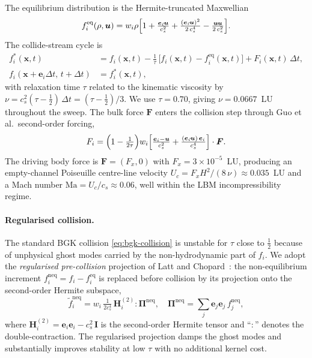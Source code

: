 \documentclass[11pt,a4paper]{article}
\begin{document}
The equilibrium distribution is the Hermite-truncated Maxwellian
\begin{equation}
f_i^{\text{eq}}(\rho,\boldsymbol u) =
   w_i \rho
   \Bigl[
     1
     + \tfrac{\boldsymbol e_i \!\cdot\! \boldsymbol u}{c_s^2}
     + \tfrac{(\boldsymbol e_i \!\cdot\! \boldsymbol u)^2}{2\,c_s^4}
     - \tfrac{\boldsymbol u \!\cdot\! \boldsymbol u}{2\,c_s^2}
   \Bigr].
\label{eq:feq}
\end{equation}
The collide-stream cycle is
\begin{align}
f_i^{*}(\boldsymbol x, t)
   &= f_i(\boldsymbol x, t)
   - \tfrac{1}{\tau}\,
     \bigl[ f_i(\boldsymbol x, t) - f_i^{\text{eq}}(\boldsymbol x, t) \bigr]
   + F_i(\boldsymbol x, t)\,\Delta t,
\label{eq:bgk-collision}
\\
f_i(\boldsymbol x + \boldsymbol e_i \Delta t,\, t + \Delta t)
   &= f_i^{*}(\boldsymbol x, t),
\label{eq:streaming}
\end{align}
with relaxation time $\tau$ related to the kinematic viscosity by
$\nu = c_s^2 (\tau - \tfrac{1}{2})\,\Delta t = (\tau - \tfrac{1}{2})/3$.
We use $\tau = 0.70$, giving $\nu = 0.0667$~LU throughout the sweep.
The bulk force $\boldsymbol F$ enters the collision step through
Guo et al.\ second-order forcing,
\begin{equation}
F_i =
   \Bigl( 1 - \tfrac{1}{2\tau} \Bigr)
   w_i
   \Bigl[
     \tfrac{\boldsymbol e_i - \boldsymbol u}{c_s^2}
     + \tfrac{(\boldsymbol e_i \!\cdot\! \boldsymbol u)\,\boldsymbol e_i}{c_s^4}
   \Bigr] \cdot \boldsymbol F.
\label{eq:guo-forcing}
\end{equation}
The driving body force is $\boldsymbol F = (F_x, 0)$ with
$F_x = 3\times 10^{-5}$~LU, producing an empty-channel Poiseuille
centre-line velocity
$U_c = F_x H^2 / (8\,\nu) \approx 0.035$~LU and a Mach number
$\mathrm{Ma} = U_c/c_s \approx 0.06$, well within the LBM
incompressibility regime.

\paragraph{Regularised collision.}
The standard BGK collision \eqref{eq:bgk-collision} is unstable for
$\tau$ close to $\tfrac{1}{2}$ because of unphysical ghost modes
carried by the non-hydrodynamic part of $f_i$. We adopt the
\emph{regularised pre-collision} projection of Latt and
Chopard~\citep{latt2006lattice}: the non-equilibrium increment
$f_i^{\text{neq}} = f_i - f_i^{\text{eq}}$ is replaced before
collision by its projection onto the second-order Hermite subspace,
\begin{equation}
\tilde f_i^{\text{neq}} =
   w_i \,
   \tfrac{1}{2 c_s^4} \,
   \boldsymbol H_i^{(2)} : \boldsymbol \Pi^{\text{neq}},
\quad
\boldsymbol \Pi^{\text{neq}} =
   \sum_j \boldsymbol e_j \boldsymbol e_j \, f_j^{\text{neq}},
\label{eq:regularised}
\end{equation}
where $\boldsymbol H_i^{(2)} = \boldsymbol e_i \boldsymbol e_i - c_s^2\,\boldsymbol I$
is the second-order Hermite tensor and ``$:$'' denotes the
double-contraction. The regularised projection damps the ghost
modes and substantially improves stability at low $\tau$ with no
additional kernel cost.
\end{document}
